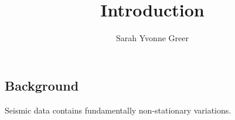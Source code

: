 \title{Introduction}
\author{Sarah Yvonne Greer}
\maketitle

\subsection{Background}
Seismic data contains fundamentally non-stationary variations.
